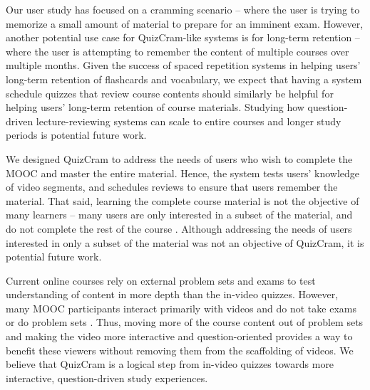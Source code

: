 \documentclass{sigchi}
\begin{document}
Our user study has focused on a cramming scenario -- where the user is trying to memorize a small amount of material to prepare for an imminent exam. However, another potential use case for QuizCram-like systems is for long-term retention -- where the user is attempting to remember the content of multiple courses over multiple months. Given the success of spaced repetition systems in helping users' long-term retention of flashcards and vocabulary, we expect that having a system schedule quizzes that review course contents should similarly be helpful for helping users' long-term retention of course materials. Studying how question-driven lecture-reviewing systems can scale to entire courses and longer study periods is potential future work. %

We designed QuizCram to address the needs of users who wish to complete the MOOC and master the entire material. Hence, the system tests users' knowledge of video segments, and schedules reviews to ensure that users remember the material. That said, learning the complete course material is not the objective of many learners  -- many users are only interested in a subset of the material, and do not complete the rest of the course \cite{deconstructing} \cite{anderson2014engaging}. Although addressing the needs of users interested in only a subset of the material was not an objective of QuizCram, it is potential future work. %

Current online courses rely on external problem sets and exams to test understanding of content in more depth than the in-video quizzes. However, many MOOC participants interact primarily with videos and do not take exams or do problem sets \cite{deconstructing} \cite{anderson2014engaging}. Thus, moving more of the course content out of problem sets and making the video more interactive and question-oriented provides a way to benefit these viewers without removing them from the scaffolding of videos. We believe that QuizCram is a logical step from in-video quizzes towards more interactive, question-driven study experiences.
\end{document}
